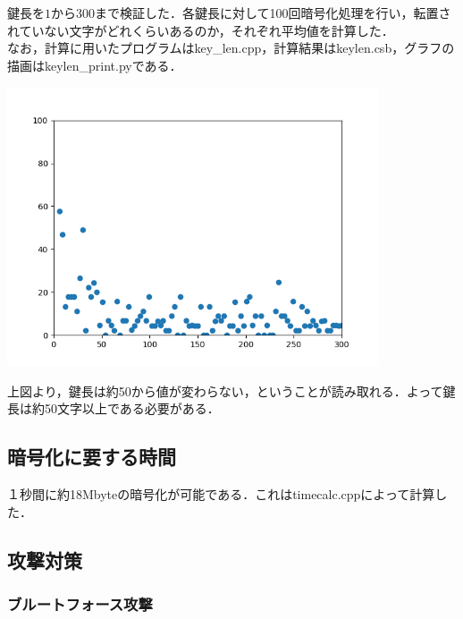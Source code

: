 \documentclass{jsarticle}
\begin{document}
鍵長を$1$から$300$まで検証した．各鍵長に対して100回暗号化処理を行い，転置されていない文字がどれくらいあるのか，それぞれ平均値を計算した．\\
なお，計算に用いたプログラムはkey\_len.cpp，計算結果はkeylen.csb，グラフの描画はkeylen\_print.pyである．\\
\begin{center}
  \includegraphics[width=11cm]{./tex_pic/figure.png}\\
\end{center}
上図より，鍵長は約50から値が変わらない，ということが読み取れる．よって鍵長は約50文字以上である必要がある．

\subsection{暗号化に要する時間}
１秒間に約18Mbyteの暗号化が可能である．これはtimecalc.cppによって計算した．

\subsection{攻撃対策}
\subsubsection{ブルートフォース攻撃}
\end{document}
